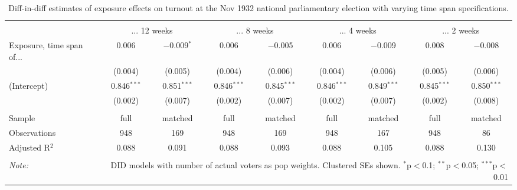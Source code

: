 
\begin{table}[!htbp] \centering 
  \caption{Diff-in-diff estimates of exposure effects on turnout at the Nov 1932 national parliamentary election with varying time span specifications.\vspace{-.25cm}} 
  \label{tab:turnout-timespan-dd-1932-2} 
\scriptsize 
\begin{tabular}{@{\extracolsep{5pt}}lcccccccc} 
\\[-1.8ex]\hline 
\hline \\[-1.8ex] 
 & \multicolumn{2}{c}{... 12 weeks} & \multicolumn{2}{c}{... 8 weeks} & \multicolumn{2}{c}{... 4 weeks} & \multicolumn{2}{c}{... 2 weeks} \\ 
 \cmidrule(r){2-3}\cmidrule(r){4-5}\cmidrule(r){6-7}\cmidrule(r){8-9}Exposure, time span of... & 0.006 & $-$0.009$^{*}$ & 0.006 & $-$0.005 & 0.006 & $-$0.009 & 0.008 & $-$0.008 \\ 
  & (0.004) & (0.005) & (0.004) & (0.006) & (0.004) & (0.006) & (0.005) & (0.006) \\ 
  (Intercept) & 0.846$^{***}$ & 0.851$^{***}$ & 0.846$^{***}$ & 0.845$^{***}$ & 0.846$^{***}$ & 0.849$^{***}$ & 0.845$^{***}$ & 0.850$^{***}$ \\ 
  & (0.002) & (0.007) & (0.002) & (0.007) & (0.002) & (0.007) & (0.002) & (0.008) \\ 
 \hline \\[-1.8ex] 
Sample & full & matched & full & matched & full & matched & full & matched \\ 
Observations & 948 & 169 & 948 & 169 & 948 & 167 & 948 & 86 \\ 
Adjusted R$^{2}$ & 0.088 & 0.091 & 0.088 & 0.093 & 0.088 & 0.105 & 0.088 & 0.130 \\ 
\hline 
\hline \\[-1.8ex] 
\textit{Note:}  & \multicolumn{8}{r}{DID models with number of actual voters as pop weights. Clustered SEs shown. $^{*}$p$<$0.1; $^{**}$p$<$0.05; $^{***}$p$<$0.01} \\ 
\end{tabular} 
\end{table} 
